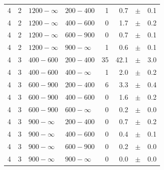 \begin{table}[!h]
\begin{tabular}{rrllrrcl}
4\T & 2 & $1200- \infty$ & $200-400$ &      1 &      0.7 &$\pm$&    0.1 \\
4 & 2 & $1200- \infty$ & $400-600$ &      0 &      1.7 &$\pm$&    0.2 \\
4 & 2 & $1200- \infty$ & $600-900$ &      0 &      0.7 &$\pm$&    0.1 \\
4 & 2 & $1200- \infty$ & $900-\infty$ &      1 &      0.6 &$\pm$&    0.1 \\
4\T & 3 & $ 400- 600$ & $200-400$ &     35 &     42.1 &$\pm$&    3.0 \\
4 & 3 & $ 400- 600$ & $400-\infty$ &      1 &      2.0 &$\pm$&    0.2 \\
4\T & 3 & $ 600- 900$ & $200-400$ &      6 &      3.3 &$\pm$&    0.4 \\
4 & 3 & $ 600- 900$ & $400-600$ &      0 &      1.6 &$\pm$&    0.2 \\
4 & 3 & $ 600- 900$ & $600-\infty$ &      0 &      0.2 &$\pm$&    0.0 \\
4\T & 3 & $ 900- \infty$ & $200-400$ &      0 &      0.7 &$\pm$&    0.2 \\
4 & 3 & $ 900- \infty$ & $400-600$ &      0 &      0.4 &$\pm$&    0.1 \\
4 & 3 & $ 900- \infty$ & $600-900$ &      0 &      0.2 &$\pm$&    0.0 \\
4 & 3 & $ 900- \infty$ & $900-\infty$ &      0 &      0.0 &$\pm$&    0.0 \\
    \hline
  \end{tabular}
\end{table}

